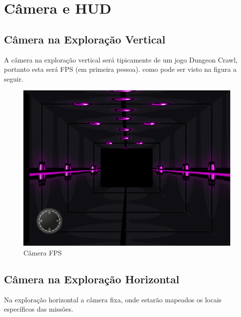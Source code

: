 \documentclass[11pt]{article} %
\begin{document}
\section{Câmera e HUD}

\subsection{Câmera na Exploração Vertical}

A câmera na exploração vertical será tipicamente de um jogo Dungeon Crawl, portanto esta será FPS (em primeira pessoa). como pode ser visto na figura a seguir.

\begin{figure}[!htp]
\centering
\includegraphics[scale=0.25]{res/dungeon.png}
\caption{Câmera FPS}
\label{Câmera FPS}
\end{figure}

\subsection{Câmera na Exploração Horizontal}

Na exploração horizontal a câmera fixa, onde estarão mapeados os locais específicos das missões.
\end{document}
